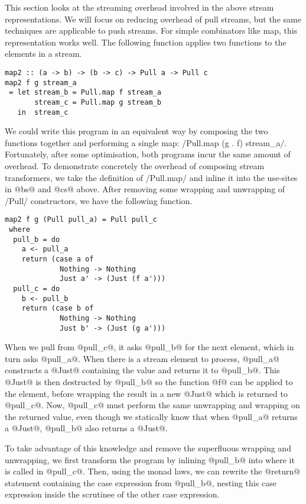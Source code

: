 This section looks at the streaming overhead involved in the above stream representations.
We will focus on reducing overhead of pull streams, but the same techniques are applicable to push streams.
For simple combinators like map, this representation works well.
The following function applies two functions to the elements in a stream.

\begin{lstlisting}
map2 :: (a -> b) -> (b -> c) -> Pull a -> Pull c
map2 f g stream_a
 = let stream_b = Pull.map f stream_a
       stream_c = Pull.map g stream_b
   in  stream_c
\end{lstlisting}

We could write this program in an equivalent way by composing the two functions together and performing a single map: \Hs/Pull.map (g . f) stream_a/.
Fortunately, after some optimisation, both programs incur the same amount of overhead.
To demonstrate concretely the overhead of composing stream transformers, we take the definition of \Hs/Pull.map/ and inline it into the use-sites in @bs@ and @cs@ above.
After removing some wrapping and unwrapping of \Hs/Pull/ constructors, we have the following function.

\begin{lstlisting}
map2 f g (Pull pull_a) = Pull pull_c
 where
  pull_b = do
    a <- pull_a
    return (case a of
             Nothing -> Nothing
             Just a' -> (Just (f a')))
  pull_c = do
    b <- pull_b
    return (case b of
             Nothing -> Nothing
             Just b' -> (Just (g a')))
\end{lstlisting}

When we pull from @pull_c@, it asks @pull_b@ for the next element, which in turn asks @pull_a@.
When there is a stream element to process, @pull_a@ constructs a @Just@ containing the value and returns it to @pull_b@.
This @Just@ is then destructed by @pull_b@ so the function @f@ can be applied to the element, before wrapping the result in a new @Just@ which is returned to @pull_c@.
Now, @pull_c@ must perform the same unwrapping and wrapping on the returned value, even though we statically know that when @pull_a@ returns a @Just@, @pull_b@ also returns a @Just@.

To take advantage of this knowledge and remove the superfluous wrapping and unwrapping, we first transform the program by inlining @pull_b@ into where it is called in @pull_c@.
Then, using the monad laws, we can rewrite the @return@ statement containing the case expression from @pull_b@, nesting this case expression inside the scrutinee of the other case expression.

